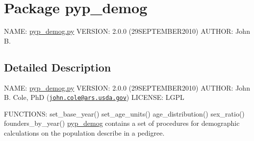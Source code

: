 \hypertarget{namespacepyp__demog}{
\section{Package pyp\_\-demog}
\label{namespacepyp__demog}
}


NAME: \hyperlink{pyp__demog_8py_source}{pyp\_\-demog.py} VERSION: 2.0.0 (29SEPTEMBER2010) AUTHOR: John B.  




\subsection{Detailed Description}
NAME: \hyperlink{pyp__demog_8py_source}{pyp\_\-demog.py} VERSION: 2.0.0 (29SEPTEMBER2010) AUTHOR: John B. Cole, PhD (\href{mailto:john.cole@ars.usda.gov}{\tt john.cole@ars.usda.gov}) LICENSE: LGPL

FUNCTIONS: set\_\-base\_\-year() set\_\-age\_\-units() age\_\-distribution() sex\_\-ratio() founders\_\-by\_\-year() \hyperlink{namespacepyp__demog}{pyp\_\-demog} contains a set of procedures for demographic calculations on the population describe in a pedigree. 